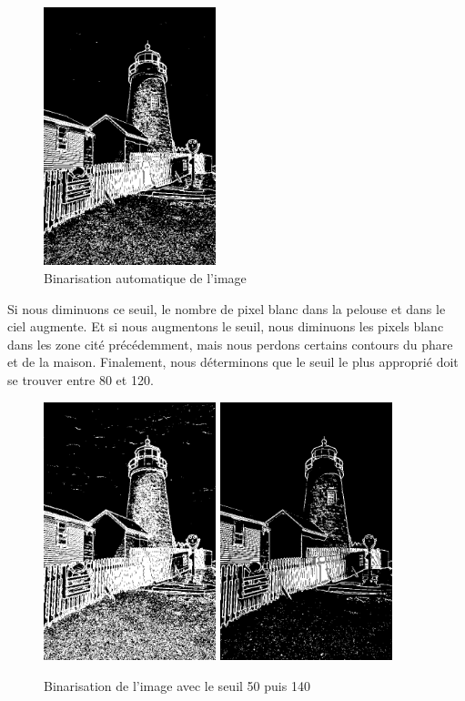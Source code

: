 \documentclass[a4paper,11pt]{article}
\begin{document}
  \begin{figure}[H]
  \center
   \includegraphics[width=5cm]{../binAuto.png}
   \caption{Binarisation automatique de l'image}
  \end{figure}
  
  Si nous diminuons ce seuil, le nombre de pixel blanc dans la pelouse et dans le ciel augmente. Et si
  nous augmentons le seuil, nous diminuons les pixels blanc dans les zone cité précédemment, mais nous
  perdons certains contours du phare et de la maison. Finalement, nous déterminons que le seuil le plus 
  approprié doit se trouver entre 80 et 120.\\
  
  \begin{figure}[H]
  \center
   \includegraphics[width=5cm]{../bin50.png}
   \includegraphics[width=5cm]{../bin140.png}
   \caption{Binarisation de l'image avec le seuil 50 puis 140}
  \end{figure}
  
\end{document}
